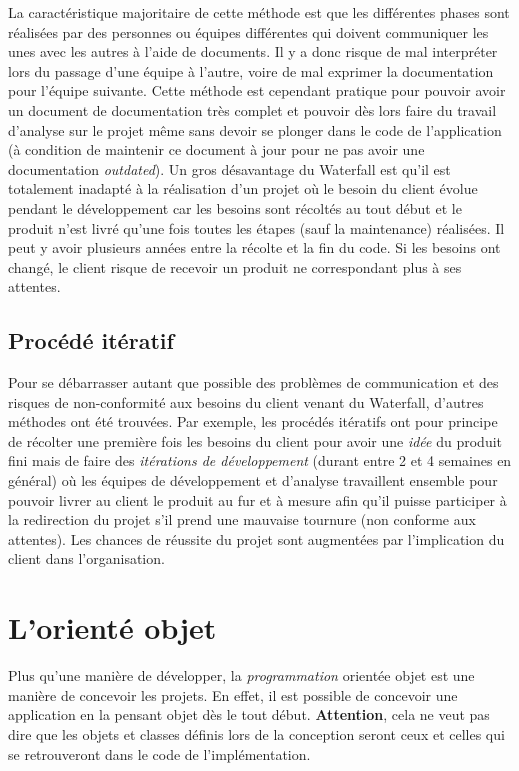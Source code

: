 \documentclass{article}
\begin{document}
		La caractéristique majoritaire de cette méthode est que les différentes phases sont réalisées par des personnes ou équipes différentes qui doivent communiquer les unes avec
		les autres à l'aide de documents. Il y a donc risque de mal interpréter lors du passage d'une équipe à l'autre, voire de mal exprimer la documentation pour l'équipe suivante.
		Cette méthode est cependant pratique pour pouvoir avoir un document de documentation très complet et pouvoir dès lors faire du travail d'analyse sur le projet même sans
		devoir se plonger dans le code de l'application (à condition de maintenir ce document à jour pour ne pas avoir une documentation \textit{outdated}). Un gros désavantage du
		Waterfall est qu'il est totalement inadapté à la réalisation d'un projet où le besoin du client évolue pendant le développement car les besoins sont récoltés au tout
		début et le produit n'est livré qu'une fois toutes les étapes (sauf la maintenance) réalisées. Il peut y avoir plusieurs années entre la récolte et la fin du code. Si les besoins
		ont changé, le client risque de recevoir un produit ne correspondant plus à ses attentes.

	\subsection{Procédé itératif}
		Pour se débarrasser autant que possible des problèmes de communication et des risques de non-conformité aux besoins du client venant du Waterfall, d'autres méthodes ont
		été trouvées. Par exemple, les procédés itératifs ont pour principe de récolter une première fois les besoins du client pour avoir une \textit{idée} du produit fini
		mais de faire des \textit{itérations de développement} (durant entre 2 et 4 semaines en général) où les équipes de développement et d'analyse travaillent ensemble pour
		pouvoir livrer au client le produit au fur et à mesure afin qu'il puisse participer à la redirection du projet s'il prend une mauvaise tournure (non conforme aux attentes).
		Les chances de réussite du projet sont augmentées par l'implication du client dans l'organisation.

\section{L'orienté objet}
	Plus qu'une manière de développer, la \textit{programmation} orientée objet est une manière de concevoir les projets. En effet, il est possible de concevoir une application
	en la pensant objet dès le tout début. \textbf{Attention}, cela ne veut pas dire que les objets et classes définis lors de la conception seront ceux et celles qui se retrouveront
	dans le code de l'implémentation.
\end{document}
